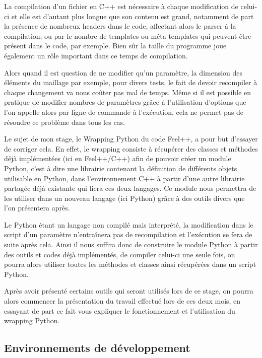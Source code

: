 \documentclass[french,12pt]{article}
\begin{document}
La compilation d'un fichier en C++ est nécessaire à chaque modification de celui-ci et elle est d'autant plus longue que son contenu est grand, notamment de part la présence de nombreux headers dans le code, affectant alors le parser à la compilation, ou par le nombre de templates ou méta templates qui peuvent être présent dans le code, par exemple. Bien sûr la taille du programme joue également un rôle important dans ce temps de compilation.
\newline

Alors quand il est question de ne modifier qu'un paramètre, la dimension des éléments du maillage par exemple, pour divers tests, le fait de devoir recompiler à chaque changement va nous coûter pas mal de temps. Même si il est possible en pratique de modifier nombres de paramètres grâce à l'utilisation d'options que l'on appelle alors par ligne de commande à l'exécution, cela ne permet pas de résoudre ce problème dans tous les cas.
\newline

Le sujet de mon stage, le Wrapping Python du code Feel++, a pour but d'essayer de corriger cela. En effet, le wrapping consiste à récupérer des classes et méthodes déjà implémentées (ici en Feel++/C++) afin de pouvoir créer un module Python, c'est à dire une librairie contenant la définition de différents objets utilisable en Python, dans l'environnement C++ à partir d'une autre librairie partagée déjà existante qui liera ces deux langages. Ce module nous permettra de les utiliser dans un nouveau langage (ici Python) grâce à des outils divers que l'on présentera après.
\newline

Le Python étant un langage non compilé mais interprété,  la modification dans le script d'un paramètre n'entraînera pas de recompilation et l'exécution se fera de suite après cela. Ainsi il nous suffira donc de construire le module Python à partir des outils et codes déjà implémentés,  de compiler celui-ci une seule fois, on pourra alors utiliser toutes les méthodes et classes ainsi récupérées dans un script Python.
\newline

Après avoir présenté certains outils qui seront utilisés lors de ce stage, on pourra alors commencer la présentation du travail effectué lors de ces deux mois, en essayant de part ce fait vous expliquer le fonctionnement et l'utilisation du wrapping Python.

\subsection{Environnements de développement}
\end{document}
